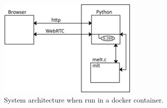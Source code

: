 \documentclass[12pt,a4paper]{article}
\begin{document}
\begin{figure}[H]
	\centering
	\includegraphics[width=0.6\textwidth]{IM2.png}
	\caption{System architecture when run in a docker container.}
\end{figure}


%
%
%
%
%
%
%
%
%
%
%
%
%
%
%
\end{document}
